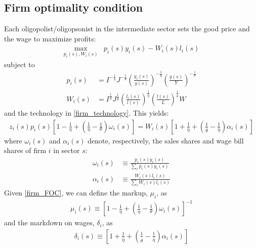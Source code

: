 \documentclass[12pt]{article}%
\begin{document}
\subsection{Firm optimality condition}
Each oligopolist/oligopsonist in the intermediate sector sets the good price and the wage to maximize profits:
\begin{align} \label{firm_problem}
    \max_{p_i(s), W_i(s)} & p_i(s) y_i(s) - W_i(s) l_i(s)
\end{align}
subject to
\begin{align}
    p_i(s) &= I^{- \frac{1}{\eta}} J^{-\frac{1}{\theta}} \left( \frac{y_i(s)}{y(s)} \right)^{- \frac{1}{\eta}} \left( \frac{y(s)}{Y} \right)^{- \frac{1}{\theta}} \label{inverse_demand} \\
    W_i(s) &= I^{\frac{1}{\hat{\eta}}} J^{\frac{1}{\hat{\theta}}} \left( \frac{l_i(s)}{l(s)} \right)^{\frac{1}{\hat{\eta}}} \left( \frac{l(s)}{L} \right)^{\frac{1}{\hat{\theta}}} W \label{inverse_laborSupply}
\end{align}
and the technology in \eqref{firm_technology}. This yields:
\begin{align} \label{firm_FOC}
    z_i(s) p_i(s)\left[ 1 - \frac{1}{\eta} + \left( \frac{1}{\eta} - \frac{1}{\theta} \right) \omega_i(s) \right] = W_i(s) \left[ 1 + \frac{1}{\hat{\eta}} + \left(\frac{1}{\hat{\theta}} - \frac{1}{\hat{\eta}}\right) \alpha_i(s) \right]
\end{align}
where $\omega_i(s)$ and $\alpha_i(s)$ denote, respectively, the sales shares and wage bill shares of firm $i$ in sector $s$:
\begin{align*}
    \omega_i(s) & \equiv \frac{p_i(s) y_i(s)}{\sum_i p_i(s) y_i(s)} \\
    \alpha_i(s) & \equiv \frac{W_i(s) l_i(s)}{\sum_i W_i(s) l_i(s)}
\end{align*}
Given \eqref{firm_FOC}, we can define the markup, $\mu_i$, as 
\begin{align} \label{markup_def}
    \mu_i(s) \equiv \left[ 1 - \frac{1}{\eta} + \left( \frac{1}{\eta} - \frac{1}{\theta} \right) \omega_i(s) \right]^{-1}
\end{align}
and the markdown on wages, $\delta_i$, as
\begin{align} \label{markdown_def}
    \delta_i(s) \equiv \left[ 1 + \frac{1}{\hat{\eta}} + \left(\frac{1}{\hat{\theta}} - \frac{1}{\hat{\eta}}\right) \alpha_i(s) \right]
\end{align} 
\end{document}
